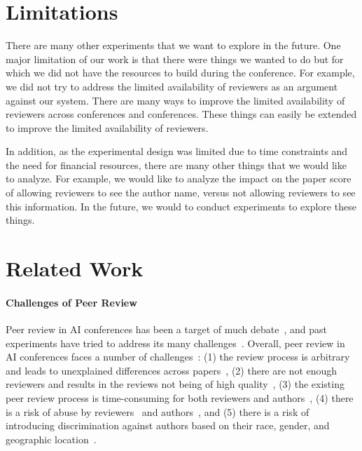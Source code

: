 \documentclass{article} %
\begin{document}
\section{Limitations}

\label{sec:limitations}
There are many other experiments that we want to explore in the future. One major limitation of our work is that there were things we wanted to do but for which we did not have the resources to build during the conference. For example, we did not try to address the limited availability of reviewers as an argument against our system. There are many ways to improve the limited availability of reviewers across conferences and conferences. These things can easily be extended to improve the limited availability of reviewers. 

In addition, as the experimental design was limited due to time constraints and the need for financial resources, there are many other things that we would like to analyze. For example, we would like to analyze the impact on the paper score of allowing reviewers to see the author name, versus not allowing reviewers to see this information. In the future, we would to conduct experiments to explore these things. 


\section{Related Work}

\paragraph{Challenges of Peer Review}
Peer review in AI conferences has been a target of much debate~\citep{shah2022challenges,freyne2010relative,kim2019author}, and past experiments have tried to address its many challenges~\citep{beygelzimer2023has,cortes2021inconsistency}. Overall, peer review in AI conferences faces a number of challenges~\citep{beygelzimer2023has}: (1) the review process is arbitrary and leads to unexplained differences across papers~\citep{beygelzimer2023has,cortes2021inconsistency}, (2) there are not enough reviewers and results in the reviews not being of high quality~\citep{tran2020open}, (3) the existing peer review process is time-consuming for both reviewers and authors~\citep{stelmakh2021novice}, (4) there is a risk of abuse by reviewers~\citep{russo2021some,nicholson2016brief} and authors~\citep{wu2021making,jecmen2024detection}, and (5) there is a risk of introducing discrimination against authors based on their race, gender, and geographic location~\cite{hargittai2020potential}.
\end{document}
